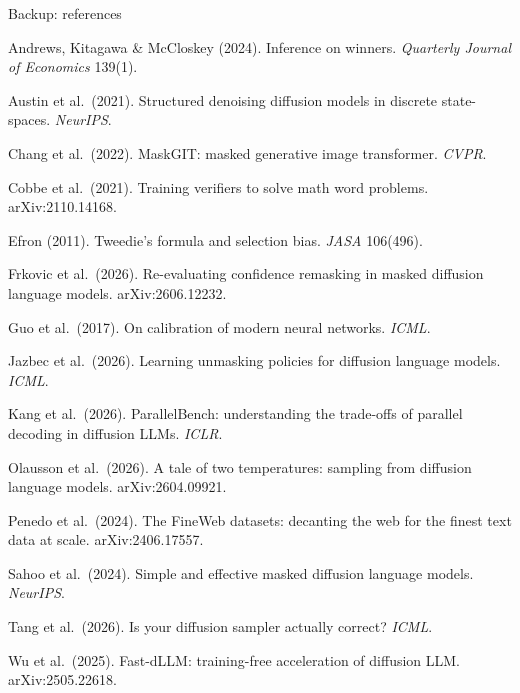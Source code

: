 \documentclass[aspectratio=169,10pt,t]{beamer}
\begin{document}
\begin{frame}{Backup: references}
  \vspace{1.5mm}
  \scriptsize
  \setlength{\parskip}{2.4pt}
  \raggedright\color{ink2}
  Andrews, Kitagawa \& McCloskey (2024). Inference on winners. \emph{Quarterly Journal of Economics} 139(1).\par
  Austin et al.\ (2021). Structured denoising diffusion models in discrete state-spaces. \emph{NeurIPS}.\par
  Chang et al.\ (2022). MaskGIT: masked generative image transformer. \emph{CVPR}.\par
  Cobbe et al.\ (2021). Training verifiers to solve math word problems. arXiv:2110.14168.\par
  Efron (2011). Tweedie's formula and selection bias. \emph{JASA} 106(496).\par
  Frkovic et al.\ (2026). Re-evaluating confidence remasking in masked diffusion language models. arXiv:2606.12232.\par
  Guo et al.\ (2017). On calibration of modern neural networks. \emph{ICML}.\par
  Jazbec et al.\ (2026). Learning unmasking policies for diffusion language models. \emph{ICML}.\par
  Kang et al.\ (2026). ParallelBench: understanding the trade-offs of parallel decoding in diffusion LLMs. \emph{ICLR}.\par
  Olausson et al.\ (2026). A tale of two temperatures: sampling from diffusion language models. arXiv:2604.09921.\par
  Penedo et al.\ (2024). The FineWeb datasets: decanting the web for the finest text data at scale. arXiv:2406.17557.\par
  Sahoo et al.\ (2024). Simple and effective masked diffusion language models. \emph{NeurIPS}.\par
  Tang et al.\ (2026). Is your diffusion sampler actually correct? \emph{ICML}.\par
  Wu et al.\ (2025). Fast-dLLM: training-free acceleration of diffusion LLM. arXiv:2505.22618.\par
\end{frame}
\end{document}
